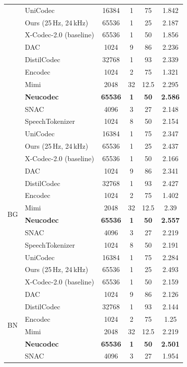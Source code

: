 \documentclass[preprint]{article}
\begin{document}
\begin{longtable}{llcccc}
  & UniCodec & 16384 & 1 & 75 & 1.842 \\
  & Ours (25\,Hz, 24\,kHz) & 65536 & 1 & 25 & 2.187 \\
  & X-Codec-2.0 (baseline) & 65536 & 1 & 50 & 1.856 \\
\newpage
\multirow{8}{*}{BE}
  & DAC & 1024 & 9 & 86 & 2.236 \\
  & DistilCodec & 32768 & 1 & 93 & 2.339 \\
  & Encodec & 1024 & 2 & 75 & 1.321 \\
  & Mimi & 2048 & 32 & 12.5 & 2.295 \\
  & \textbf{Neucodec} & \textbf{65536} & \textbf{1} & \textbf{50} & \textbf{2.586} \\
  & SNAC & 4096 & 3 & 27 & 2.148 \\
  & SpeechTokenizer & 1024 & 8 & 50 & 2.154 \\
  & UniCodec & 16384 & 1 & 75 & 2.347 \\
  & Ours (25\,Hz, 24\,kHz) & 65536 & 1 & 25 & 2.437 \\
  & X-Codec-2.0 (baseline) & 65536 & 1 & 50 & 2.166 \\
\midrule
\multirow{8}{*}{BG}
  & DAC & 1024 & 9 & 86 & 2.341 \\
  & DistilCodec & 32768 & 1 & 93 & 2.427 \\
  & Encodec & 1024 & 2 & 75 & 1.402 \\
  & Mimi & 2048 & 32 & 12.5 & 2.39 \\
  & \textbf{Neucodec} & \textbf{65536} & \textbf{1} & \textbf{50} & \textbf{2.557} \\
  & SNAC & 4096 & 3 & 27 & 2.219 \\
  & SpeechTokenizer & 1024 & 8 & 50 & 2.191 \\
  & UniCodec & 16384 & 1 & 75 & 2.284 \\
  & Ours (25\,Hz, 24\,kHz) & 65536 & 1 & 25 & 2.493 \\
  & X-Codec-2.0 (baseline) & 65536 & 1 & 50 & 2.159 \\
\midrule
\multirow{8}{*}{BN}
  & DAC & 1024 & 9 & 86 & 2.126 \\
  & DistilCodec & 32768 & 1 & 93 & 2.144 \\
  & Encodec & 1024 & 2 & 75 & 1.25 \\
  & Mimi & 2048 & 32 & 12.5 & 2.219 \\
  & \textbf{Neucodec} & \textbf{65536} & \textbf{1} & \textbf{50} & \textbf{2.501} \\
  & SNAC & 4096 & 3 & 27 & 1.954 \\

\end{longtable}
\end{document}
